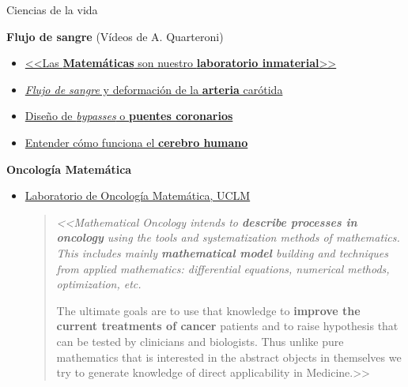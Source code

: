 \documentclass[
  unknownkeysallowed %
]{beamer}
\begin{document}
\begin{frame}{Ciencias de la vida}

  {\large\bf Flujo de sangre} (Vídeos de A. Quarteroni)

  \begin{itemize}
  \item \href{https://youtu.be/8W4oFOymiyM?t=511}{<<Las
      \textbf{Matemáticas} son nuestro \textbf{laboratorio
        inmaterial}>>}
  \item \href{https://youtu.be/8W4oFOymiyM?t=645}{\textit{Flujo de sangre} y deformación de la \textbf{arteria} carótida}
  \item \href{https://youtu.be/8W4oFOymiyM?t=787}{Diseño de \textit{bypasses} o \textbf{puentes coronarios}}
  \item \href{https://youtu.be/8W4oFOymiyM?t=823}{Entender cómo funciona el \textbf{cerebro humano}}
  \end{itemize}
  \bigskip
  {\large\bf Oncología Matemática}
  \begin{itemize}
  \item
    \href{http://matematicas.uclm.es/imaci/molab/mathoncol}{Laboratorio
      de Oncología Matemática, UCLM}
    \begin{quotation}\scriptsize\em
      <<Mathematical Oncology intends to \textbf{describe processes in oncology}
      using the tools and systematization methods of mathematics. This
      includes mainly \textbf{mathematical model} building and techniques from
      applied mathematics: differential equations, numerical methods,
      optimization, etc.

      The ultimate goals are to use that knowledge to \textbf{improve the
      current treatments of cancer} patients and to raise hypothesis
      that can be tested by clinicians and biologists. Thus unlike
      pure mathematics that is interested in the abstract objects in
      themselves we try to generate knowledge of direct applicability
      in Medicine.>>
    \end{quotation}
  \end{itemize}
\end{frame}
\end{document}

